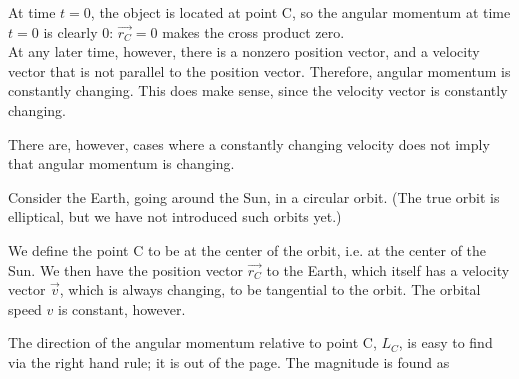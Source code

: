 At time $t = 0$, the object is located at point C, so the angular momentum at time $t = 0$ is clearly 0: $\vec{r_C} = 0$ makes the cross product zero.\\
At any later time, however, there is a nonzero position vector, and a velocity vector that is not parallel to the position vector. Therefore, angular momentum is constantly changing. This does make sense, since the velocity vector is constantly changing.

There are, however, cases where a constantly changing velocity does not imply that angular momentum is changing.

Consider the Earth, going around the Sun, in a circular orbit. (The true orbit is elliptical, but we have not introduced such orbits yet.)

We define the point C to be at the center of the orbit, i.e. at the center of the Sun. We then have the position vector $\vec{r_C}$ to the Earth, which itself has a velocity vector $\vec{v}$, which is always changing, to be tangential to the orbit. The orbital speed $v$ is constant, however.

\begin{figure}[H]
  \centering
{}
\end{figure}


The direction of the angular momentum relative to point C, $L_C$, is easy to find via the right hand rule; it is out of the page. The magnitude is found as

